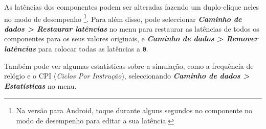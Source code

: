\documentclass[11pt,a4paper,twoside,titlepage]{article}
\newcommand{\menupath}[1]{\textbf{\emph{#1}}}
\begin{document}
As latências dos componentes podem ser alteradas fazendo um duplo-clique
neles no modo de desempenho \footnote{Na versão para Android, toque durante
alguns segundos no componente no modo de desempenho para editar a sua
latência.}.
Para além disso, pode seleccionar 
\menupath{Caminho de dados > Restaurar latências} no menu para restaurar as
latências de todos os componentes para os seus valores originais, e
\menupath{Caminho de dados > Remover latências} para colocar todas as
latências a \verb+0+.

Também pode ver algumas estatísticas sobre a simulação, como a frequência de
relógio e o CPI (\emph{Ciclos Por Instrução}), seleccionando
\menupath{Caminho de dados > Estatísticas} no menu.
\end{document}
